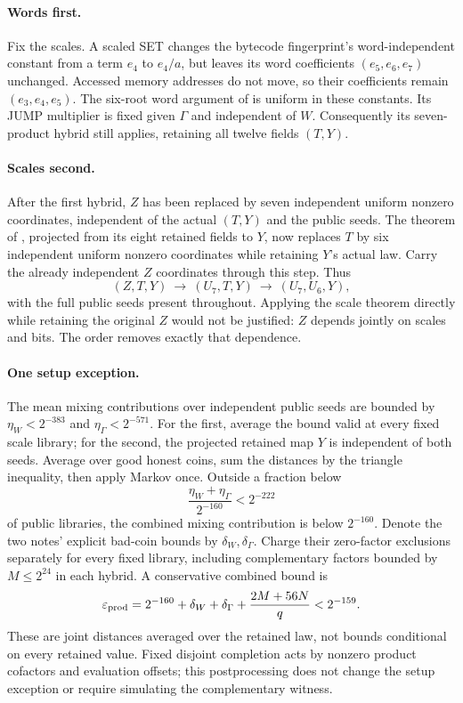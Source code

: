 \paragraph{Words first.} Fix the scales. A scaled SET changes the bytecode fingerprint's word-independent constant from a term $e_4$ to $e_4/a$, but leaves its word coefficients $(e_5,e_6,e_7)$ unchanged. Accessed memory addresses do not move, so their coefficients remain $(e_3,e_4,e_5)$. The six-root word argument of  is uniform in these constants. Its JUMP multiplier is fixed given $\Gamma$ and independent of $W$. Consequently its seven-product hybrid still applies, retaining all twelve fields $(T,Y)$.

\paragraph{Scales second.} After the first hybrid, $Z$ has been replaced by seven independent uniform nonzero coordinates, independent of the actual $(T,Y)$ and the public seeds. The theorem of , projected from its eight retained fields to $Y$, now replaces $T$ by six independent uniform nonzero coordinates while retaining $Y$'s actual law. Carry the already independent $Z$ coordinates through this step. Thus
\[
 (Z,T,Y)\ \longrightarrow\ (U_7,T,Y)\
           \longrightarrow\ (U_7,U_6,Y),
\]
with the full public seeds present throughout. Applying the scale theorem directly while retaining the original $Z$ would not be justified: $Z$ depends jointly on scales and bits. The order removes exactly that dependence.

\paragraph{One setup exception.} The mean mixing contributions over independent public seeds are bounded by $\eta_W<2^{-383}$ and $\eta_\Gamma<2^{-571}$. For the first, average the bound valid at every fixed scale library; for the second, the projected retained map $Y$ is independent of both seeds. Average over good honest coins, sum the distances by the triangle inequality, then apply Markov once. Outside a fraction below
\[
 \frac{\eta_W+\eta_\Gamma}{2^{-160}}<2^{-222}
\]
of public libraries, the combined mixing contribution is below $2^{-160}$. Denote the two notes' explicit bad-coin bounds by $\delta_W,\delta_\Gamma$. Charge their zero-factor exclusions separately for every fixed library, including complementary factors bounded by $M\le2^{24}$ in each hybrid. A conservative combined bound is
\[
 \varepsilon_{\rm prod}
 =2^{-160}+\delta_W+\delta_\Gamma+\frac{2M+56N}{q}
 <2^{-159}.
\]
These are joint distances averaged over the retained law, not bounds conditional on every retained value. Fixed disjoint completion acts by nonzero product cofactors and evaluation offsets; this postprocessing does not change the setup exception or require simulating the complementary witness.

